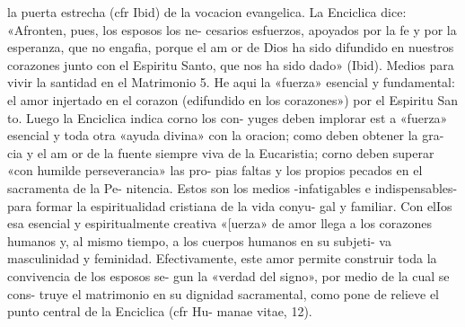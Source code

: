 \documentclass[letterpaper]{report}
\begin{document}
la puerta estrecha (cfr Ibid) de la vocacion evangelica. 
La Enciclica dice: «Afronten, pues, los esposos los ne- 
cesarios esfuerzos, apoyados por la fe y por la esperanza, 
que no engafia, porque el am or de Dios ha sido difundido 
en nuestros corazones junto con el Espiritu Santo, que nos 
ha sido dado» (Ibid). 
Medios para vivir la santidad en el Matrimonio 
5. He aqui la «fuerza» esencial y fundamental: el amor 
injertado en el corazon (edifundido en los corazones») por 
el Espiritu San to. Luego la Enciclica indica corno los con- 
yuges deben implorar est a «fuerza» esencial y toda otra 
«ayuda divina» con la oracion; como deben obtener la gra- 
cia y el am or de la fuente siempre viva de la Eucaristia; 
corno deben superar «con humilde perseverancia» las pro- 
pias faltas y los propios pecados en el sacramenta de la Pe- 
nitencia. 
Estos son los medios -infatigables e indispensables- 
para formar la espiritualidad cristiana de la vida conyu- 
gal y familiar. Con elIos esa esencial y espiritualmente 
creativa «[uerza» de amor llega a los corazones humanos 
y, al mismo tiempo, a los cuerpos humanos en su subjeti- 
va masculinidad y feminidad. Efectivamente, este amor 
permite construir toda la convivencia de los esposos se- 
gun la «verdad del signo», por medio de la cual se cons- 
truye el matrimonio en su dignidad sacramental, como 
pone de relieve el punto central de la Enciclica (cfr Hu- 
manae vitae, 12).
	
\end{document}
